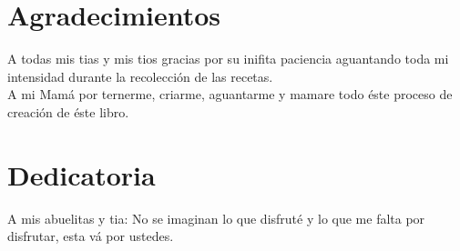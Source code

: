 \chapter{Agradecimientos}
A todas mis tias y mis tios gracias por su inifita paciencia aguantando toda mi intensidad durante la recolección de las recetas. \\

A mi Mamá por ternerme, criarme, aguantarme y mamare todo éste proceso de creación de éste libro.
\chapter{Dedicatoria}
A mis abuelitas y tia: No se imaginan lo que disfruté y lo que me falta por disfrutar, esta vá por ustedes.